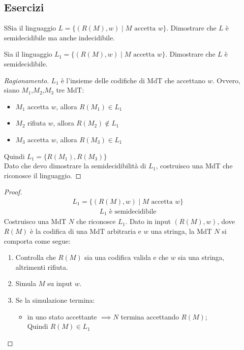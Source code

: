 \documentclass{article}  %
\theoremstyle{definition}
\newenvironment{ragionamento}[1][]
  {\begin{proof}[Ragionamento#1]\renewcommand{\qedsymbol}{}\normalfont}
  {\end{proof}}
\begin{document}
\subsection{Esercizi}
\begin{theorem}{}
	SSia il linguaggio $L = \{(R(M), w) \mid M \text{ accetta } w\}$. Dimostrare che $L$ è semidecidibile ma anche indecidibile.
\end{theorem}
\begin{esercizio}[Esercizio 2.1]
	\footnotesize %
	Sia il linguaggio $L_1 = \{(R(M), w) \mid M \text{ accetta } w\}$. Dimostrare che $L$ è semidecidibile.
	\begin{ragionamento}
		$L_1$ è l'insieme delle codifiche di MdT che accettano $w$. Ovvero, siano $M_1$,$M_2$,$M_3$ tre MdT:
		\begin{itemize}
			\item $M_1$ accetta $w$, allora $R(M_1) \in L_1$
			\item $M_2$ rifiuta $w$, allora $R(M_2) \notin L_1$
			\item $M_3$ accetta $w$, allora $R(M_3) \in L_1$
		\end{itemize}
		Quindi \(L_1=\{R(M_1),R(M_3)\}\)  \\
		Dato che devo dimostrare la semidecidibilità di $L_1$, costruisco una MdT che riconosce il linguaggio.
	\end{ragionamento}
	\begin{proof}
		\begin{align*}
			L_1 = \{(R(M), w) \mid M \text{ accetta } w\} \tag*{(ipotesi)}
		\end{align*}
		\begin{align*}
			L_1 \text{ è semidecidibile} \tag*{(tesi)}
		\end{align*}
		Costruisco una MdT $N$ che riconosce $L_1$.
		Dato in input $(R(M),w)$, dove $R(M)$ è la codifica di una MdT arbitraria e $w$ una stringa, la MdT $N$ si comporta come segue:
		\begin{enumerate}
			\item Controlla che $R(M)$ sia una codifica valida e che $w$ sia una stringa, altrimenti rifiuta.
			\item Simula $M$ su input $w$.
			\item Se la simulazione termina:
			      \begin{itemize}
				      \item in uno stato accettante $\implies N$ termina accettando $R(M)$; \\ Quindi $R(M) \in L_1$

\end{itemize}
\end{enumerate}
\end{proof}
\end{esercizio}
\end{document}
